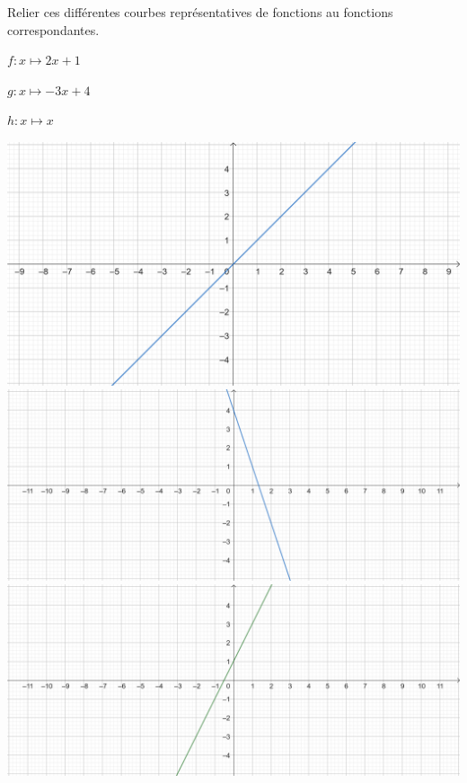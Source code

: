 \documentclass{exam}
\begin{document}
\begin{exercize}
Relier ces différentes courbes représentatives de fonctions au fonctions correspondantes.

\begin{minipage}{0.4\textwidth}
$f \colon x \mapsto 2x + 1$

$g \colon x \mapsto -3x + 4$

$h \colon x \mapsto x$
\end{minipage}
\begin{minipage}{0.4\textwidth}
\includegraphics[width=\textwidth]{Figure3.png}
\includegraphics[width=\textwidth]{Figure2.png}
\includegraphics[width=\textwidth]{Figure1.png}
\end{minipage}
\end{exercize}
\end{document}
